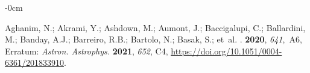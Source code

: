 \documentclass[universe,article,accept,moreauthors,pdftex]{Definitions/mdpi}
\begin{document}
%
%
%












\begin{adjustwidth}{-\extralength}{0cm}

\printendnotes[custom]






%


{}

%


\begin{thebibliography}{999}

Aghanim, N.; Akrami, Y.; Ashdown, M.; Aumont, J.; Baccigalupi, C.; Ballardini, M.; Banday, A.J.; Barreiro, R.B.; Bartolo, N.; Basak, S.;  et~al.
.
 {\bf 2020}, {\em 641},~A6,
\newblock Erratum: \emph{Astron. Astrophys.} \textbf{2021}, \emph{652}, C4,
{\href{https://doi.org/10.1051/0004-6361/201833910}{{https://doi.org/10.1051/0004-6361/201833910}}}.


\end{thebibliography}
\end{adjustwidth}
\end{document}
